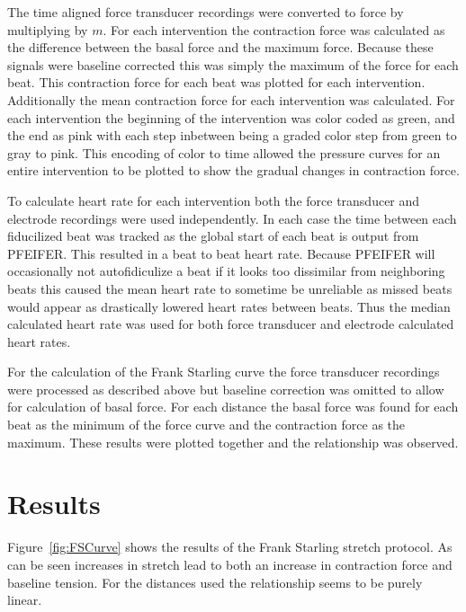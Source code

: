\documentclass[12pt]{article}
\begin{document}
\par{}
The time aligned force transducer recordings were converted to force by multiplying by $m$. For each intervention the contraction force was calculated as the difference between the basal force and the maximum force. Because these signals were baseline corrected this was simply the maximum of the force for each beat. This contraction force for each beat was plotted for each intervention. Additionally the mean contraction force for each intervention was calculated. For each intervention the beginning of the intervention was color coded as green, and the end as pink with each step inbetween being a graded color step from green to gray to pink. This encoding of color to time allowed the pressure curves for an entire intervention to be plotted to show the gradual changes in contraction force.

\par{}
To calculate heart rate for each intervention both the force transducer and electrode recordings were used independently. In each case the time between each fiducilized beat was tracked as the global start of each beat is output from PFEIFER. This resulted in a beat to beat heart rate. Because PFEIFER will occasionally not autofidiculize a beat if it looks too dissimilar from neighboring beats this caused the mean heart rate to sometime be unreliable as missed beats would appear as drastically lowered heart rates between beats. Thus the median calculated heart rate was used for both force transducer and electrode calculated heart rates.

\par{}
For the calculation of the Frank Starling curve the force transducer recordings were processed as described above but baseline correction was omitted to allow for calculation of basal force. For each distance the basal force was found for each beat as the minimum of the force curve and the contraction force as the maximum. These results were plotted together and the relationship was observed.

\section{Results}

\par{}
Figure~\ref{fig:FSCurve} shows the results of the Frank Starling stretch protocol. As can be seen increases in stretch lead to both an increase in contraction force and baseline tension. For the distances used the relationship seems to be purely linear.
\end{document}
